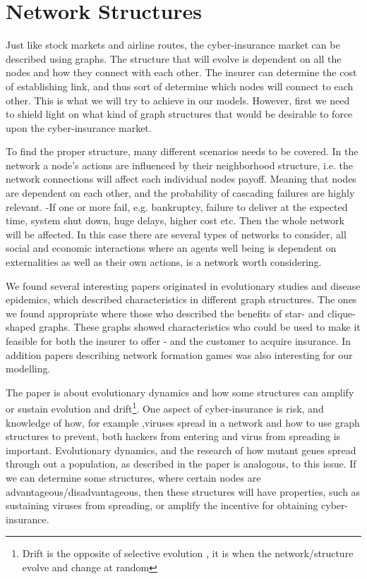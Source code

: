 \section{Network Structures}

Just like stock markets and airline routes, the cyber-insurance market can be described using graphs. The structure that will evolve is dependent on all the nodes and how they connect with each other. The insurer can determine the cost of establishing link, and thus sort of determine which nodes will connect to each other. This is what we will try to achieve in our models. However, first we need to shield light on what kind of graph structures that would be desirable to force upon the cyber-insurance market.

To find the proper structure, many different scenarios needs to be covered. In the network a node's actions are influenced by their neighborhood structure, i.e. the network connections will affect each individual nodes payoff. Meaning that nodes are dependent on each other, and the probability of cascading failures are highly relevant. -If one or more fail, e.g. bankruptcy, failure to deliver at the expected time, system shut down, huge delays, higher cost etc. Then the whole network will be affected. In this case there are several types of networks to consider, all social and economic interactions where an agents well being is dependent on externalities as well as their own actions, is a network worth considering.

We found several interesting papers originated in evolutionary studies and disease epidemics, which described  characteristics in different graph structures. The ones we found appropriate where those who described the benefits of star- and clique-shaped graphs. These graphs showed characteristics who could be used to make it feasible for both the insurer to offer - and the customer to acquire insurance. In addition papers describing network formation games was also interesting for our modelling. 

 The paper \cite{lieberman2005evolutionary} is about evolutionary dynamics and how some structures
can amplify or sustain evolution and drift\footnote{Drift is the opposite of selective evolution
, it is when the network/structure evolve and change at random}. One aspect of cyber-insurance is risk, and knowledge of how, for example ,viruses spread in a network and how to use graph structures to prevent, both hackers from entering and virus from spreading is important. Evolutionary dynamics, and the research of how mutant genes spread through out a population, as described in the paper is analogous, to this issue.
If we can determine some structures, where certain nodes are advantageous/disadvantageous, then these structures will have properties, such as sustaining viruses from spreading, or amplify the incentive for obtaining cyber-insurance. 

